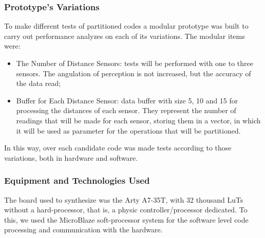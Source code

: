     \subsubsection{Prototype's Variations}
        To make different tests of partitioned codes a modular prototype was built to carry out performance analyzes on each of its variations.
        The modular items were:
        \begin{itemize}
            \item The Number of Distance Sensors: tests will be performed with one to three sensors.
            The angulation of perception is not increased, but the accuracy of the data read;
            
            \item Buffer for Each Distance Sensor: data buffer with size 5, 10 and 15 for processing the distances of each sensor.
            They represent the number of readings that will be made for each sensor, storing them in a vector, in which it will be used as parameter for the operations that will be partitioned.
        \end{itemize}
        In this way, over each candidate code was made tests according to those variations, both in hardware and software.
    
    
    \subsubsection{Equipment and Technologies Used}
        The board used to synthesize was the Arty A7-35T, with 32 thousand LuTs without a hard-processor, that is, a physic controller/processor dedicated.
        To this, we used the MicroBlaze soft-processor system for the software level code processing and communication with the hardware.
        
